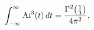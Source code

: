 \[\int_{-\infty}^{\infty}{\mathop{\mathrm{Ai}\/}\nolimits^{3}}\!\left(t\right)dt%
=\frac{{\mathop{\Gamma\/}\nolimits^{2}}\!\left(\frac{1}{3}\right)}{4\pi^{2}},\]